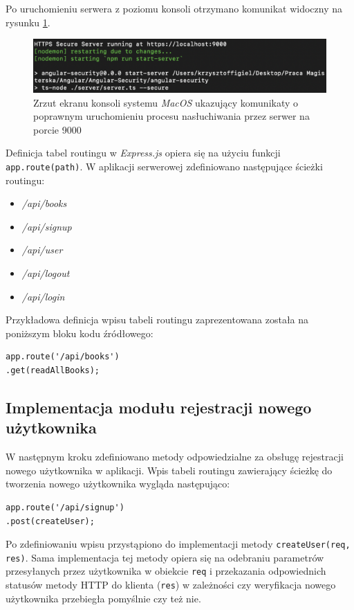 Po uruchomieniu serwera z poziomu konsoli otrzymano komunikat widoczny na rysunku \ref{Rys:nodejs-running}.

\begin{figure}[h]
	\centering\includegraphics[scale=0.76]{images/nodejs/server-running.png}
	\caption{Zrzut ekranu konsoli systemu \textit{MacOS} ukazujący komunikaty o poprawnym uruchomieniu procesu nasłuchiwania przez serwer na porcie 9000}
	\label{Rys:nodejs-running}
\end{figure}

Definicja tabel routingu w \textit{Express.js} opiera się na użyciu funkcji \texttt{app.route(path)}. W aplikacji serwerowej zdefiniowano następujące ścieżki routingu:

\begin{itemize}
	\item \textit{/api/books}
	\item \textit{/api/signup}
	\item \textit{/api/user}
	\item \textit{/api/logout}
	\item \textit{/api/login}
\end{itemize}

Przykładowa definicja wpisu tabeli routingu zaprezentowana została na poniższym bloku kodu źródłowego:

\begin{verbatim}
app.route('/api/books')
.get(readAllBooks);
\end{verbatim}

\subsection{Implementacja modułu rejestracji nowego użytkownika} 
W następnym kroku zdefiniowano metody odpowiedzialne za obsługę rejestracji nowego użytkownika w aplikacji. Wpis tabeli routingu zawierający ścieżkę do tworzenia nowego użytkownika wygląda następująco:

\begin{verbatim}
app.route('/api/signup')
.post(createUser);
\end{verbatim}

Po zdefiniowaniu wpisu przystąpiono do implementacji metody \texttt{createUser(req, res)}. Sama implementacja tej metody opiera się na odebraniu parametrów przesyłanych przez użytkownika w obiekcie \texttt{req} i przekazania odpowiednich statusów metody HTTP do klienta (\texttt{res}) w zależności czy weryfikacja nowego użytkownika przebiegła pomyślnie czy też nie. 

